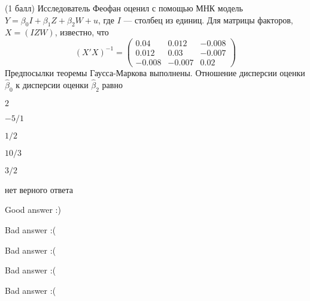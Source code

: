 
\begin{question}
(1 балл) Исследователь Феофан оценил с помощью МНК модель
\(Y = \beta_0 I + \beta_1 Z + \beta_2 W + u\), где \(I\) --- столбец из
единиц. Для матрицы факторов, \(X = (I Z W)\), известно, что \[
(X'X)^{-1} = \begin{pmatrix}
0.04 & 0.012 & -0.008 \\
0.012 & 0.03 & -0.007 \\
-0.008 & -0.007 & 0.02
\end{pmatrix}
\] Предпосылки теоремы Гаусса-Маркова выполнены. Отношение дисперсии
оценки \(\hat \beta_0\) к дисперсии оценки \(\hat \beta_2\) равно
\begin{answerlist}
  \item \(2\)
  \item \(-5/1\)
  \item \(1/2\)
  \item \(10/3\)
  \item \(3/2\)
  \item нет верного ответа
\end{answerlist}
\end{question}

\begin{solution}
\begin{answerlist}
  \item Good answer :)
  \item Bad answer :(
  \item Bad answer :(
  \item Bad answer :(
  \item Bad answer :(
\end{answerlist}
\end{solution}
